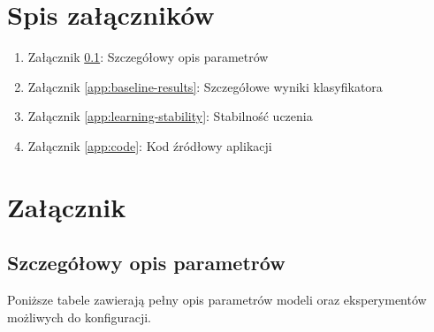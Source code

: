 \documentclass[a4paper,11pt,twoside]{report}
\renewcommand*{\thetable}{\arabic{chapter}.\arabic{table}}
\theoremstyle{definition}
\begin{document}
\chapter*{Spis załączników}
\begin{enumerate}
    \item Załącznik \ref{app:hyperparams}: Szczegółowy opis parametrów
    \item Załącznik \ref{app:baseline-results}: Szczegółowe wyniki klasyfikatora
    \item Załącznik \ref{app:learning-stability}: Stabilność uczenia
    \item Załącznik \ref{app:code}: Kod źródłowy aplikacji
\end{enumerate}


















\chapter*{Załącznik} 
\appendix
\renewcommand{\thesection}{\Alph{section}}
\renewcommand{\thetable}{\Alph{section}.\arabic{table}}
\setcounter{table}{0}

\section{Szczegółowy opis parametrów}\label{app:hyperparams}

Poniższe tabele zawierają pełny opis parametrów modeli oraz eksperymentów możliwych do konfiguracji.
\end{document}
